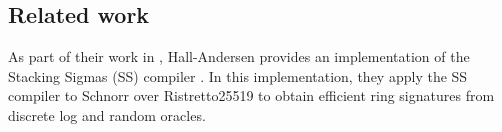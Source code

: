 \subsection{Related work}
\label{sec:related_work}
As part of their work in \cite{StackingSigmas}, Hall-Andersen provides an implementation of the Stacking Sigmas (SS) compiler \cite{MHAStackSig}. In this implementation, they apply the SS compiler to Schnorr over Ristretto25519 to obtain efficient ring signatures from discrete log and random oracles. 

